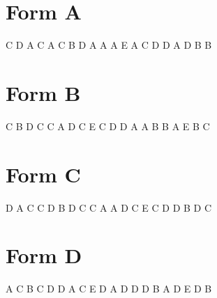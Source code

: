 \documentclass[12pt]{article}
\begin{document}
\section*{Form A}

C
D
A
C
A
C
B
D
A
A
A
E
A
C
D
D
A
D
B
B
\section*{Form B}

C
B
D
C
C
A
D
C
E
C
D
D
A
A
B
B
A
E
B
C
\section*{Form C}

D
A
C
C
D
B
D
C
C
A
A
D
C
E
C
D
D
B
D
C
\section*{Form D}

A
C
B
C
D
D
A
C
E
D
A
D
D
D
B
A
D
E
D
B
\end{document}
